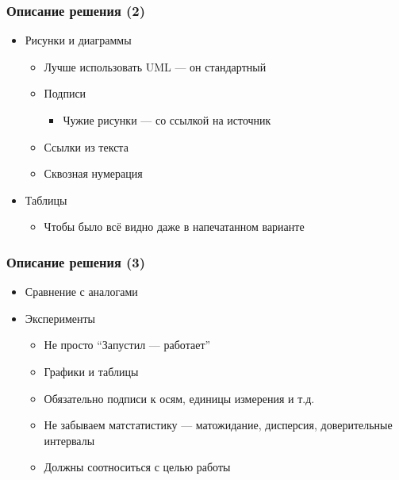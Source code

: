 \documentclass[xetex,mathserif,serif]{beamer}
\begin{document}
	\begin{frame}
		\frametitle{Описание решения (2)}
		\begin{itemize}
			\item Рисунки и диаграммы
			\begin{itemize}
				\item Лучше использовать UML --- он стандартный
				\item Подписи
				\begin{itemize}
					\item Чужие рисунки --- со ссылкой на источник
				\end{itemize}
				\item Ссылки из текста
				\item Сквозная нумерация
			\end{itemize}
			\item Таблицы
			\begin{itemize}
				\item Чтобы было всё видно даже в напечатанном варианте
			\end{itemize}
		\end{itemize}
	\end{frame}

	\begin{frame}
		\frametitle{Описание решения (3)}
		\begin{itemize}
			\item Сравнение с аналогами
			\item Эксперименты
			\begin{itemize}
				\item Не просто ``Запустил --- работает''
				\item Графики и таблицы
				\item Обязательно подписи к осям, единицы измерения и т.д.
				\item Не забываем матстатистику --- матожидание, дисперсия, доверительные интервалы
				\item Должны соотноситься с целью работы
			\end{itemize}
		\end{itemize}
	\end{frame}
\end{document}
